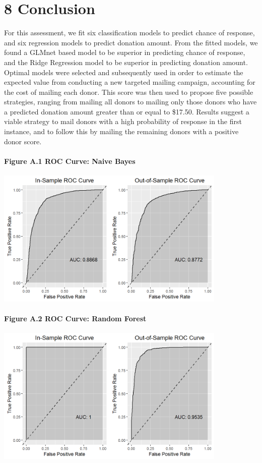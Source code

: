 \documentclass[]{article}
\let\oldparagraph\paragraph
\renewcommand{\paragraph}[1]{\oldparagraph{#1}\mbox{}}
\begin{document}
\section{8 Conclusion}\label{conclusion}

For this assessment, we fit six classification models to predict chance
of response, and six regression models to predict donation amount. From
the fitted models, we found a GLMnet based model to be superior in
predicting chance of response, and the Ridge Regression model to be
superior in predicting donation amount. Optimal models were selected and
subsequently used in order to estimate the expected value from
conducting a new targeted mailing campaign, accounting for the cost of
mailing each donor. This score was then used to propose five possible
strategies, ranging from mailing all donors to mailing only those donors
who have a predicted donation amount greater than or equal to \$17.50.
Results suggest a viable strategy to mail donors with a high probability
of response in the first instance, and to follow this by mailing the
remaining donors with a positive donor score.

\newpage

\paragraph{Figure A.1 ROC Curve: Naive
Bayes}\label{figure-a.1-roc-curve-naive-bayes}

\includegraphics[height=2.60417in]{images/resp_nb_sample_roc.png}

\paragraph{Figure A.2 ROC Curve: Random
Forest}\label{figure-a.2-roc-curve-random-forest}

\includegraphics[height=2.60417in]{images/resp_rfc_sample_roc.png}
\end{document}
